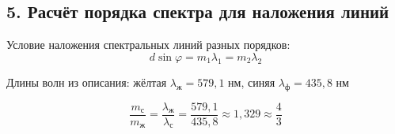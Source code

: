 \documentclass[12pt,a4paper]{article}
\begin{document}
















\subsection*{5. Расчёт порядка спектра для наложения линий}

Условие наложения спектральных линий разных порядков:
\begin{equation}
    d \sin \varphi = m_1 \lambda_1 = m_2 \lambda_2
\end{equation}

\noindent Длины волн из описания: жёлтая $\lambda_{\text{ж}} = 579{,}1$ нм, синяя $\lambda_{\text{ф}} = 435{,}8$ нм


\begin{equation}
    \frac{m_{\text{с}}}{m_{\text{ж}}} = \frac{\lambda_{\text{ж}}}{\lambda_{\text{с}}} = \frac{579{,}1}{435{,}8} \approx 1{,}329 \approx \frac{4}{3}
\end{equation}
\end{document}
